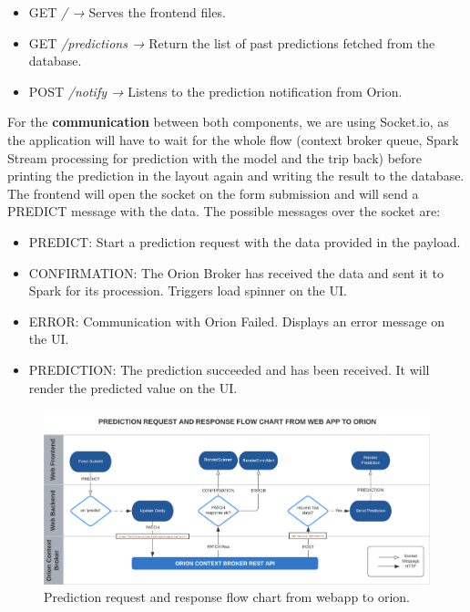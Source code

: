 \begin{itemize}
\item GET \textit{/ →} Serves the frontend files.
\item GET \textit{/predictions →} Return the list of past predictions fetched from the database.
\item POST \textit{/notify →}  Listens to the prediction notification from Orion.
\end{itemize}

For the \textbf{communication} between both components, we are using Socket.io, as the application will have to wait for the whole flow (context broker queue, Spark Stream processing for prediction with the model and the trip back) before printing the prediction in the layout again and writing the result to the database. The frontend will open the socket on the form submission and will send a PREDICT message with the data. The possible messages over the socket are:


\begin{itemize}
    \item PREDICT: Start a prediction request with the data provided in the payload.
    \item CONFIRMATION: The Orion Broker has received the data and sent it to Spark for its procession. Triggers load spinner on the UI.
    \item ERROR: Communication with Orion Failed. Displays an error message on the UI.
    \item PREDICTION: The prediction succeeded and has been received. It will render the predicted value on the UI.
\end{itemize}

\begin{figure}[H]
	\centering
	\includegraphics[width=0.9\linewidth]{imagenes/flow-chart-web-orion.png}
	\caption{Prediction request and response flow chart from webapp to orion.}
	\label{flow-chart-web-orion}
\end{figure}


